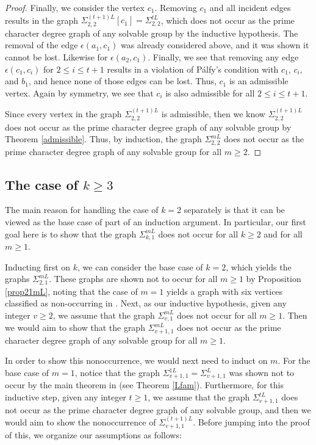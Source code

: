 \documentclass[11pt]{amsart}
\theoremstyle{definition}
\theoremstyle{remark}
\numberwithin{equation}{section}
\newcommand{\SL}[2]{\Sigma_{#1,#2}^L} %
\newcommand{\SLi}[3]{\Sigma_{#1,#2}^{#3L}} %
\begin{document}
\begin{proof}
Finally, we consider the vertex $c_1$. Removing $c_1$ and all incident edges results in the graph $\SLi{2}{2}{(t+1)}[c_1]=\SLi{2}{2}{t}$, which does not occur as the prime character degree graph of any solvable group by the inductive hypothesis. The removal of the edge $\epsilon(a_1,c_1)$ was already considered above, and it was shown it cannot be lost. Likewise for $\epsilon(a_2,c_1)$. Finally, we see that removing any edge $\epsilon(c_1,c_i)$ for $2\leq i\leq t+1$ results in a violation of P\'alfy's condition with $c_1$, $c_i$, and $b_1$, and hence none of those edges can be lost. Thus, $c_1$ is an admissible vertex. Again by symmetry, we see that $c_i$ is also admissible for all $2\leq i\leq t+1$.

Since every vertex in the graph $\SLi{2}{2}{(t+1)}$ is admissible, then we know $\SLi{2}{2}{(t+1)}$ does not occur as the prime character degree graph of any solvable group by Theorem \ref{admissible}. Thus, by induction, the graph $\SLi{2}{2}{m}$ does not occur as the prime character degree graph of any solvable group for all $m\geq2$.
\end{proof}

\subsection{The case of $k\geq3$}

The main reason for handling the case of $k=2$ separately is that it can be viewed as the base case of part of an induction argument. In particular, our first goal here is to show that the graph $\SLi{k}{1}{m}$ does not occur for all $k\geq2$ and for all $m\geq1$.

Inducting first on $k$, we can consider the base case of $k=2$, which yields the graphs $\SLi{2}{1}{m}$. These graphs are shown not to occur for all $m\geq1$ by Proposition \ref{prop21mL}, noting that the case of $m=1$ yields a graph with six vertices classified as non-occurring in \cite{BLL}. Next, as our inductive hypothesis, given any integer $v\geq2$, we assume that the graph $\SLi{v}{1}{m}$ does not occur for all $m\geq1$. Then we would aim to show that the graph $\SLi{v+1}{1}{m}$ does not occur as the prime character degree graph of any solvable group for all $m\geq1$.

In order to show this nonoccurrence, we would next need to induct on $m$. For the base case of $m=1$, notice that the graph $\SLi{v+1}{1}{1}=\SL{v+1}{1}$ was shown not to occur by the main theorem in \cite{LM} (see Theorem \ref{Lfam}). Furthermore, for this inductive step, given any integer $t\geq1$, we assume that the graph $\SLi{v+1}{1}{t}$ does not occur as the prime character degree graph of any solvable group, and then we would aim to show the nonoccurrence of $\SLi{v+1}{1}{(t+1)}$. Before jumping into the proof of this, we organize our assumptions as follows:
\end{document}
